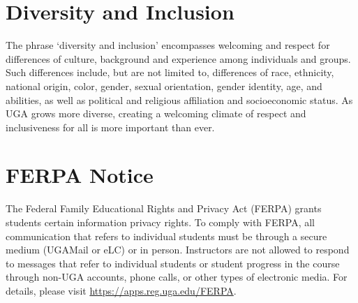 \documentclass[12pt]{article}
\begin{document}
\vspace{-2mm}
\section*{\normalsize Diversity and Inclusion}
\vspace{-4mm}
The phrase ‘diversity and inclusion’ encompasses welcoming and respect
for differences of culture, background and experience among
individuals and groups. Such differences include, but are not limited
to, differences of race, ethnicity, national origin, color, gender,
sexual orientation, gender identity, age, and abilities, as well as
political and religious affiliation and socioeconomic status. As UGA
grows more diverse, creating a welcoming climate of respect and
inclusiveness for all is more important than ever. 




\vspace{-2mm}
\section*{\normalsize FERPA Notice}
\vspace{-4mm}

The Federal Family Educational Rights and Privacy Act (FERPA) grants
students certain information privacy rights. To comply with FERPA, all
communication that refers to individual students must be through a
secure medium (UGAMail or eLC) or in person. Instructors are not
allowed to respond to messages that refer to individual students or
student progress in the course through non-UGA accounts, phone calls,
or other types of electronic media. For details, please visit
\url{https://apps.reg.uga.edu/FERPA}. 
\end{document}
